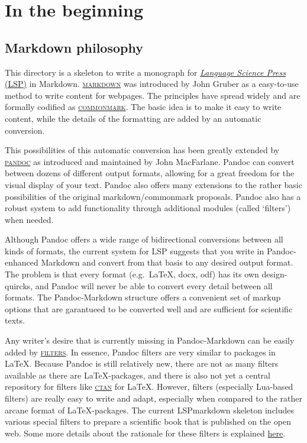 \hypertarget{in-the-beginning}{%
\chapter{In the beginning}\label{in-the-beginning}}

\hypertarget{markdown-philosophy}{%
\section{Markdown philosophy}\label{markdown-philosophy}}

This\paragraphnumber{[1.1]} directory is a skeleton to write a monograph
for \href{https://langsci-press.org}{\emph{Language Science Press}
(LSP)} in Markdown.
\href{https://daringfireball.net/projects/markdown/}{\textsc{markdown}}
was introduced by John Gruber as a easy-to-use method to write content
for webpages. The principles have spread widely and are formally
codified as \href{https://commonmark.org}{\textsc{commonmark}}. The
basic idea is to make it easy to write content, while the details of the
formatting are added by an automatic conversion.

This\paragraphnumber{[1.2]} possibilities of this automatic conversion
has been greatly extended by \href{https://pandoc.org}{\textsc{pandoc}}
as introduced and maintained by John MacFarlane. Pandoc can convert
between dozens of different output formats, allowing for a great freedom
for the visual display of your text. Pandoc also offers many extensions
to the rather basic possibilities of the original markdown/commonmark
proposals. Pandoc also has a robust system to add functionality through
additional modules (called `filters') when needed.

Although\paragraphnumber{[1.3]} Pandoc offers a wide range of
bidirectional conversions between all kinds of formats, the current
system for LSP suggests that you write in Pandoc-enhanced Markdown and
convert from that basis to any desired output format. The problem is
that every format (e.g.~LaTeX, docx, odf) has its own design-quircks,
and Pandoc will never be able to convert every detail between all
formats. The Pandoc-Markdown structure offers a convenient set of markup
options that are garantueed to be converted well and are sufficient for
scientific texts.

Any\paragraphnumber{[1.4]} writer's desire that is currently missing in
Pandoc-Markdown can be easily added by
\href{https://pandoc.org/lua-filters.html}{\textsc{filters}}. In
essence, Pandoc filters are very similar to packages in LaTeX. Because
Pandoc is still relatively new, there are not as many filters available
as there are LaTeX-packages, and there is also not yet a central
repository for filters like \href{https://ctan.org}{\textsc{ctan}} for
LaTeX. However, filters (especially Lua-based filters) are really easy
to write and adapt, especially when compared to the rather arcane format
of LaTeX-packages. The current LSPmarkdown skeleton includes various
special filters to prepare a scientific book that is published on the
open web. Some more details about the rationale for these filters is
explained \href{https://cysouw.github.io/openwebpublishing/}{here}.

